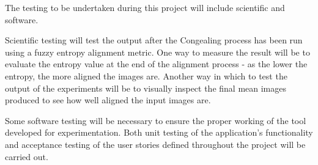 The testing to be undertaken during this project will include scientific and software.


Scientific testing will test the output after the \Gls{Congealing} process has been run using a fuzzy entropy alignment metric. One way to measure the result will be to evaluate the entropy value at the end of the alignment process - as the lower the entropy, the more aligned the images are. Another way in which to test the output of the experiments will be to visually inspect the final mean images produced to see how well aligned the input images are.


Some software testing will be necessary to ensure the proper working of the tool developed for experimentation. Both unit testing of the application's functionality and acceptance testing of the user stories defined throughout the project will be carried out.
